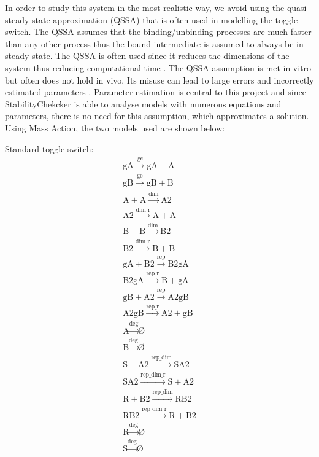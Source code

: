 In order to study this system in the most realistic way, we avoid using the quasi-steady state approximation (QSSA) that is often used in modelling the toggle switch. The QSSA assumes that the binding/unbinding processes are much faster than any other process \autocite{Loinger:2007vma} thus the bound intermediate is assumed to always be in steady state. The QSSA is often used since it reduces the dimensions of the system thus reducing computational time \autocite{Pedersen:2007ke}. The QSSA assumption is met in vitro but often does not hold in vivo. Its misuse can lead to large errors and incorrectly estimated parameters \autocite{Pedersen:2007ke}. Parameter estimation is central to this project and since StabilityChekcker is able to analyse models with numerous equations and parameters, there is no need for this assumption, which approximates a solution. Using Mass Action, the two models used are shown below:

Standard toggle switch:
$$
\begin{array}{cccc}
      \textrm{gA}\stackrel{\textrm{ge}}{\longrightarrow}\textrm{gA} + \textrm{A} \\
      \textrm{gB}\stackrel{\textrm{ge}}{\longrightarrow}\textrm{gB} + \textrm{B} \\
      \textrm{A} + \textrm{A} \stackrel{\textrm{dim}}{\longrightarrow}\textrm{A2} \\
      \textrm{A2} \stackrel{\textrm{dim r}}{\longrightarrow}\textrm{A} + \textrm{A} \\
      \textrm{B} + \textrm{B} \stackrel{\textrm{dim}}{\longrightarrow} \textrm{B2} \\
      \textrm{B2} \stackrel{\textrm{dim\_r}}{\longrightarrow}\textrm{B} + \textrm{B} \\
      \textrm{gA} + \textrm{B2} \stackrel{\textrm{rep}}{\longrightarrow}\textrm{B2gA} \\
      \textrm{B2gA} \stackrel{\textrm{rep\_r}}{\longrightarrow}\textrm{B} + \textrm{gA} \\
      \textrm{gB} + \textrm{A2} \stackrel{\textrm{rep}}{\longrightarrow}\textrm{A2gB} \\
      \textrm{A2gB} \stackrel{\textrm{rep\_r}}{\longrightarrow}\textrm{A2} + \textrm{gB} \\
      \textrm{A} \stackrel{\textrm{deg}}{\longrightarrow}\textrm{\O}\\
      \textrm{B} \stackrel{\textrm{deg}}{\longrightarrow}\textrm{\O}\\
      \textrm{S} + \textrm{A2} \stackrel{\textrm{rep\_dim}}{\longrightarrow}\textrm{SA2}\\
      \textrm{SA2} \stackrel{\textrm{rep\_dim\_r}}{\longrightarrow}\textrm{S} + \textrm{A2}\\
      \textrm{R} + \textrm{B2} \stackrel{\textrm{rep\_dim}}{\longrightarrow}\textrm{RB2}\\
      \textrm{RB2} \stackrel{\textrm{rep\_dim\_r}}{\longrightarrow}\textrm{R} + \textrm{B2}\\
      \textrm{R} \stackrel{\textrm{deg}}{\longrightarrow} \textrm{\O}\\
      \textrm{S} \stackrel{\textrm{deg}}{\longrightarrow}\textrm{\O}\\
\end{array}
$$

